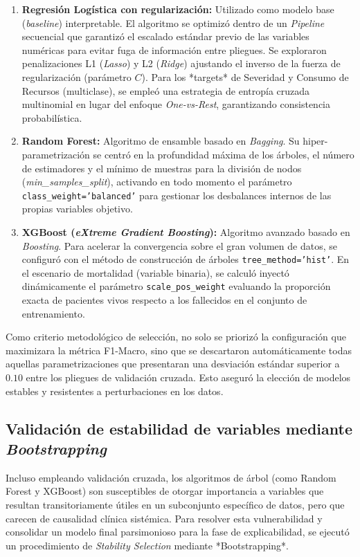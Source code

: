 \begin{enumerate}
    \item \textbf{Regresión Logística con regularización:} Utilizado como modelo base (\textit{baseline}) interpretable. El algoritmo se optimizó dentro de un \textit{Pipeline} secuencial que garantizó el escalado estándar previo de las variables numéricas para evitar fuga de información entre pliegues. Se exploraron penalizaciones L1 (\textit{Lasso}) y L2 (\textit{Ridge}) ajustando el inverso de la fuerza de regularización (parámetro $C$). Para los *targets* de Severidad y Consumo de Recursos (multiclase), se empleó una estrategia de entropía cruzada multinomial en lugar del enfoque \textit{One-vs-Rest}, garantizando consistencia probabilística.
    \item \textbf{Random Forest:} Algoritmo de ensamble basado en \textit{Bagging}. Su hiper-parametrización se centró en la profundidad máxima de los árboles, el número de estimadores y el mínimo de muestras para la división de nodos (\textit{min\_samples\_split}), activando en todo momento el parámetro \texttt{class\_weight='balanced'} para gestionar los desbalances internos de las propias variables objetivo.
    \item \textbf{XGBoost (\textit{eXtreme Gradient Boosting}):} Algoritmo avanzado basado en \textit{Boosting}. Para acelerar la convergencia sobre el gran volumen de datos, se configuró con el método de construcción de árboles \texttt{tree\_method='hist'}. En el escenario de mortalidad (variable binaria), se calculó inyectó dinámicamente el parámetro \texttt{scale\_pos\_weight} evaluando la proporción exacta de pacientes vivos respecto a los fallecidos en el conjunto de entrenamiento.
\end{enumerate}

Como criterio metodológico de selección, no solo se priorizó la configuración que maximizara la métrica F1-Macro, sino que se descartaron automáticamente todas aquellas parametrizaciones que presentaran una desviación estándar superior a $0.10$ entre los pliegues de validación cruzada. Esto aseguró la elección de modelos estables y resistentes a perturbaciones en los datos.

\subsection{Validación de estabilidad de variables mediante \textit{Bootstrapping}}
Incluso empleando validación cruzada, los algoritmos de árbol (como Random Forest y XGBoost) son susceptibles de otorgar importancia a variables que resultan transitoriamente útiles en un subconjunto específico de datos, pero que carecen de causalidad clínica sistémica. Para resolver esta vulnerabilidad y consolidar un modelo final parsimonioso para la fase de explicabilidad, se ejecutó un procedimiento de \textit{Stability Selection} mediante *Bootstrapping*.

